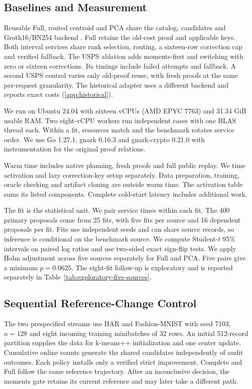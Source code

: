 \documentclass[5p,times,twocolumn]{elsarticle}
\begin{document}
\subsection{Baselines and Measurement}
Reusable Full, routed centroid and PCA share the catalog, candidates
and Groth16/BN254 backend \cite{groth2016}. Full retains the old-cost proof
and applicable keys. Both interval services share rank selection, routing,
a sixteen-row correction cap and verified fallback. The USPS ablation
adds moments-first and switching with zero or sixteen corrections. Its timings include failed attempts and fallback. A second USPS
control varies only old-proof reuse, with fresh proofs at the same
per-request granularity. The historical adapter uses a different
backend and reports exact costs (\ref{app:historical}).

We run on Ubuntu 24.04 with sixteen vCPUs (AMD EPYC 7763) and
31.34 GiB usable RAM. Two eight-vCPU workers run independent cases
with one BLAS thread each. Within a fit, resources match and the
benchmark rotates service order. We use Go 1.27.1, gnark 0.16.3 and
gnark-crypto 0.21.0 with instrumentation for the original proof relations.

Warm time includes native planning, fresh proofs and full public
replay. We time activation and lazy correction-key setup separately.
Data preparation, training, oracle checking and artifact cloning
are outside warm time. The activation table sums its listed components.
Complete cold-start latency includes additional work.

The fit is the statistical unit. We pair service times within each
fit. The 400 primary proposals come from 25 fits, with five fits per
source and 16 dependent proposals per fit. Fits use independent seeds
and can share source records, so inference is conditional on the
benchmark source. We compute Student-$t$ 95\% intervals on paired log
ratios and use two-sided exact sign-flip tests. We apply Holm adjustment
across five sources separately for Full and PCA. Five pairs give a
minimum $p=0.0625$. The eight-fit follow-up is exploratory and is
reported separately in Table~\ref{tab:exploratory-five-sources}.

\subsection{Sequential Reference-Change Control}
The two prespecified streams use HAR and Fashion-MNIST with seed 7103,
$n=128$ and eight incoming training minibatches of 32 rows. An initial
512-record partition supplies the data for k-means++ initialization
and one center update. Cumulative online counts generate the shared
candidates independently of audit outcomes. Each policy installs only
a verified strict improvement. Complete and Full follow the same
reference trajectory. After an inconclusive decision, the moments
gate retains its current reference and may later take a different path.
\end{document}
